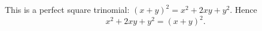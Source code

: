 This is a perfect square trinomial: $(x+y)^2=x^2+2xy+y^2$. Hence
\[
x^2+2xy+y^2=\boxed{(x+y)^2}.
\]
